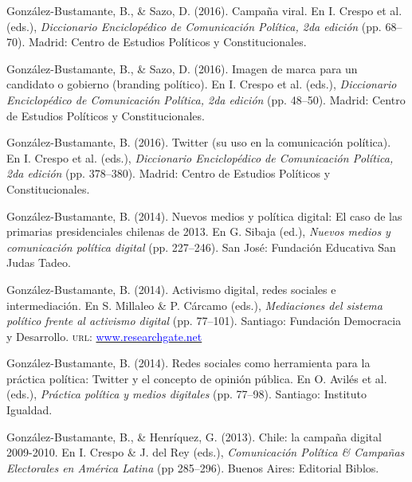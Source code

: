 \begin{publications}
\begin{benumerate}{12}
\item{González-Bustamante, B., \& Sazo, D. (2016). Campaña viral. En I. Crespo et al. (eds.), {\itshape Diccionario Enciclopédico de Comunicación Política, 2da edición} (pp. 68--70). Madrid: Centro de Estudios Políticos y Constitucionales.}\vspace{1mm}

\item{González-Bustamante, B., \& Sazo, D. (2016). Imagen de marca para un candidato o gobierno (branding político). En I. Crespo et al. (eds.), {\itshape Diccionario Enciclopédico de Comunicación Política, 2da edición} (pp. 48--50). Madrid: Centro de Estudios Políticos y Constitucionales.}\vspace{1mm}

\item{González-Bustamante, B. (2016). Twitter (su uso en la comunicación política). En I. Crespo et al. (eds.), {\itshape Diccionario Enciclopédico de Comunicación Política, 2da edición} (pp. 378--380). Madrid: Centro de Estudios Políticos y Constitucionales.}\vspace{1mm}

\item{González-Bustamante, B. (2014). Nuevos medios y política digital: El caso de las primarias presidenciales chilenas de 2013. En G. Sibaja (ed.), {\itshape Nuevos  medios y comunicación política digital} (pp. 227--246). San José: Fundación Educativa San Judas Tadeo.}\vspace{1mm}

\item{González-Bustamante, B. (2014). Activismo digital, redes sociales e intermediación. En S. Millaleo \& P. C\'arcamo (eds.), {\itshape Mediaciones del  sistema político frente al activismo digital} (pp. 77--101). Santiago: Fundación Democracia y Desarrollo. {\scshape url:} \href{https://www.researchgate.net/publication/321992867_Activismo_digital_redes_sociales_e_intermediacion}{\textcolor{blue}{www.researchgate.net}}}\vspace{1mm}

\item{González-Bustamante, B. (2014). Redes sociales como herramienta para la práctica política: Twitter y el concepto de opinión pública. En O. Avilés et al. (eds.), {\itshape Práctica política y medios digitales} (pp. 77--98). Santiago: Instituto Igualdad.}\vspace{1mm}

\item{González-Bustamante, B., \& Henríquez, G. (2013). Chile: la campaña digital 2009-2010. En I. Crespo \& J. del Rey (eds.), {\itshape Comunicación Política \& Campañas Electorales en América Latina} (pp 285--296). Buenos Aires: Editorial Biblos.}\vspace{1mm}

\end{benumerate}

\end{publications}
